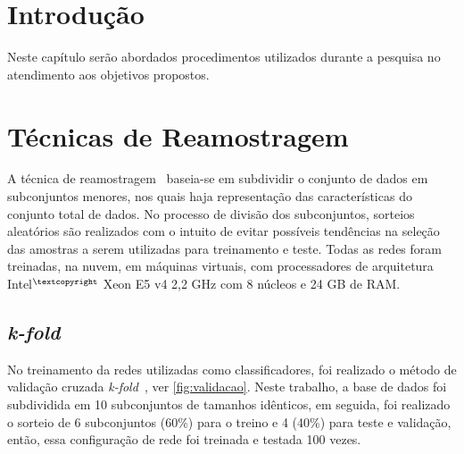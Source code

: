 
\section*{Introdução}


Neste capítulo serão abordados procedimentos utilizados durante a pesquisa no atendimento aos objetivos propostos. 




\section{Técnicas de Reamostragem}
A técnica de reamostragem~\cite[p. 41]{thesis:giovani2006} baseia-se em subdividir o conjunto de dados em subconjuntos menores, nos quais haja representação das características do conjunto total de dados. No processo de divisão dos subconjuntos, sorteios aleatórios são realizados com o intuito de evitar possíveis tendências na seleção das amostras a serem utilizadas para treinamento e teste. Todas as redes foram treinadas, na nuvem, em máquinas virtuais, com processadores de arquitetura Intel$^{\textcopyright}$ Xeon E5 v4 2,2 GHz com 8 núcleos e 24 GB de RAM.

\subsection{\textit{k-fold}}

No treinamento da redes utilizadas como classificadores, foi realizado o método de validação cruzada \textit{k-fold}~\cite{book:kattifaceli2011, Xu2018}, ver \autoref{fig:validacao}. Neste trabalho, a base de dados foi subdividida em 10 subconjuntos de tamanhos idênticos, em seguida, foi realizado o sorteio de 6 subconjuntos (60\%) para o treino e 4 (40\%) para teste e validação, então, essa configuração de rede foi treinada e testada 100 vezes.


